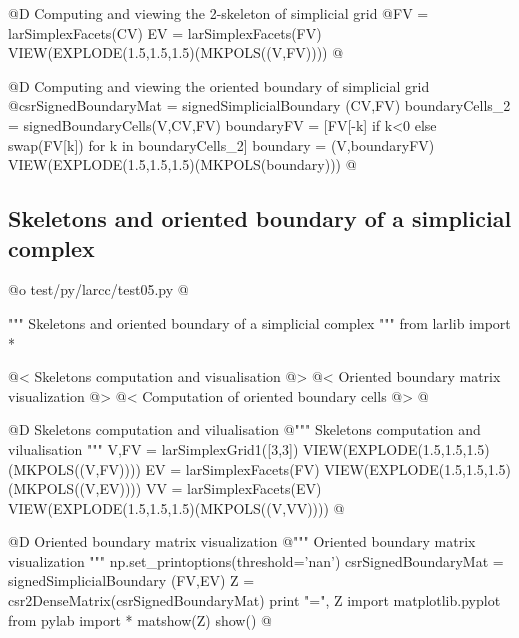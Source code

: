 \documentclass[11pt,oneside]{article}	%
\begin{document}
@D Computing and viewing the 2-skeleton of simplicial grid
@{FV = larSimplexFacets(CV)
EV = larSimplexFacets(FV)
VIEW(EXPLODE(1.5,1.5,1.5)(MKPOLS((V,FV))))
@}

@D Computing and viewing the oriented boundary of simplicial grid
@{csrSignedBoundaryMat = signedSimplicialBoundary (CV,FV)
boundaryCells_2 = signedBoundaryCells(V,CV,FV)
boundaryFV = [FV[-k] if k<0 else swap(FV[k]) for k in boundaryCells_2]
boundary = (V,boundaryFV)
VIEW(EXPLODE(1.5,1.5,1.5)(MKPOLS(boundary)))
@}


\subsection{Skeletons and oriented boundary of a simplicial complex}


@o test/py/larcc/test05.py
@{""" Skeletons and oriented boundary of a simplicial complex """
from larlib import *

@< Skeletons computation and visualisation @>
@< Oriented boundary matrix visualization @>
@< Computation of oriented boundary cells @>
@}


@D Skeletons computation and vilualisation
@{""" Skeletons computation and vilualisation """
V,FV = larSimplexGrid1([3,3])
VIEW(EXPLODE(1.5,1.5,1.5)(MKPOLS((V,FV))))
EV = larSimplexFacets(FV)
VIEW(EXPLODE(1.5,1.5,1.5)(MKPOLS((V,EV))))
VV = larSimplexFacets(EV)
VIEW(EXPLODE(1.5,1.5,1.5)(MKPOLS((V,VV))))
@}

@D Oriented boundary matrix visualization
@{""" Oriented boundary matrix visualization """
np.set_printoptions(threshold='nan')
csrSignedBoundaryMat = signedSimplicialBoundary (FV,EV)
Z = csr2DenseMatrix(csrSignedBoundaryMat)
print "\ncsrSignedBoundaryMat =\n", Z
import matplotlib.pyplot
from pylab import *
matshow(Z)
show()
@}
\end{document}
